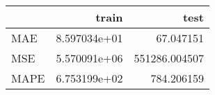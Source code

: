 \begin{tabular}{lrr}
\toprule
{} &         train &           test \\
\midrule
MAE  &  8.597034e+01 &      67.047151 \\
MSE  &  5.570091e+06 &  551286.004507 \\
MAPE &  6.753199e+02 &     784.206159 \\
\bottomrule
\end{tabular}
